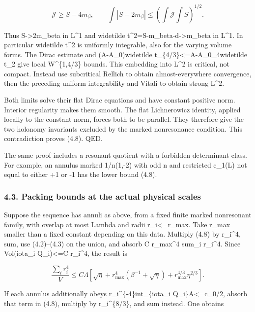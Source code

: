\documentclass[
  10pt,
]{article}
\begin{document}
\[
 \mathcal J\ge S-4m_\beta,\qquad
 \int|S-2m_\beta|
      \le\left(\int\mathcal J\int S\right)^{1/2}.
\]

Thus S-\textgreater2m\_beta in L\^{}1 and \textbar widetilde
t\textbar\^{}2=S-m\_beta-d-\textgreater m\_beta in L\^{}1. In particular
\textbar widetilde t\textbar\^{}2 is uniformly integrable, also for the
varying volume forms. The Dirac estimate and
\textbar\textbar(A-A\_0)widetilde
t\textbar\textbar\_\{4/3\}\textless=\textbar\textbar A-A\_0\textbar\textbar\_4\textbar\textbar widetilde
t\textbar\textbar\_2 give local W\^{}\{1,4/3\} bounds. This embedding
into L\^{}2 is critical, not compact. Instead use subcritical Rellich to
obtain almost-everywhere convergence, then the preceding uniform
integrability and Vitali to obtain strong L\^{}2.

Both limits solve their flat Dirac equations and have constant positive
norm. Interior regularity makes them smooth. The flat Lichnerowicz
identity, applied locally to the constant norm, forces both to be
parallel. They therefore give the two holonomy invariants excluded by
the marked nonresonance condition. This contradiction proves (4.8). QED.

The same proof includes a resonant quotient with a forbidden determinant
class. For example, an annulus marked 1/n(1,-2) with odd n and
restricted c\_1(L) not equal to either +1 or -1 has the lower bound
(4.8).

\hypertarget{packing-bounds-at-the-actual-physical-scales}{%
\subsubsection{4.3. Packing bounds at the actual physical
scales}\label{packing-bounds-at-the-actual-physical-scales}}

Suppose the sequence has annuli as above, from a fixed finite marked
nonresonant family, with overlap at most Lambda and radii
r\_i\textless=r\_max. Take r\_max smaller than a fixed constant
depending on this data. Multiply (4.8) by r\_i\^{}4, sum, use
(4.2)--(4.3) on the union, and absorb C r\_max\^{}4 sum\_i r\_i\^{}4.
Since Vol(iota\_i Q\_i)\textless=C r\_i\^{}4, the result is

\[
 \boxed{\frac{\sum_i r_i^4}{V}\le C\Lambda
  [\sqrt\eta+r_{\max}^4(\beta^{-1}+\sqrt\eta)
                         +r_{\max}^{4/3}\eta^{2/3}].}            \tag{4.9}
\]

If each annulus additionally obeys r\_i\^{}\{-4\}int\_\{iota\_i
Q\_i\}A\textless=c\_0/2, absorb that term in (4.8), multiply by
r\_i\^{}\{8/3\}, and sum instead. One obtains
\end{document}
